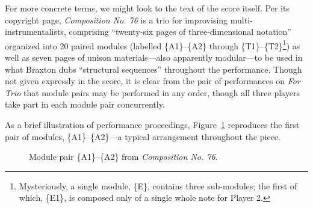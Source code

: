         For more concrete terms, we might look to the text of the score itself. Per its copyright page, \textit{Composition No. 76} is a trio for improvising multi-instrumentalists, comprising ``twenty-six pages of three-dimensional notation'' organized into 20 paired modules (labelled \{A1\}--\{A2\} through \{T1\}--\{T2\}\footnote{Mysteriously, a single module, \{E\}, contains three sub-modules; the first of which, \{E1\}, is composed only of a single whole note for Player 2.}) as well as seven pages of unison materials---also apparently modular---to be used in what Braxton dubs ``structural sequences'' throughout the performance.\autocite[149]{Braxton_1988} Though not given expressly in the score, it is clear from the pair of performances on \textit{For Trio} that module pairs may be performed in any order, though all three players take part in each module pair concurrently.
        
        As a brief illustration of performance proceedings, Figure~\ref{fig:a1a2} reproduces the first pair of modules, \{A1\}--\{A2\}---a typical arrangement throughout the piece.
    
                \begin{figure} 
                    \centering
                    \captionsetup{width=.5\textwidth}
                    \caption[Module pair \{A1\}--\{A2\} from \textit{Composition No. 76}.]{Module pair \{A1\}--\{A2\} from \textit{Composition No. 76}.\footnotemark}
                    \label{fig:a1a2}
                \end{figure}
    
